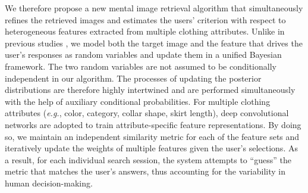 \documentclass[journal]{IEEEtran}
\begin{document}
We therefore propose a new mental image retrieval algorithm that simultaneously refines the retrieved images and estimates the users' criterion with respect to heterogeneous features extracted from multiple clothing attributes.
Unlike in previous studies \cite{fang2005experiments,ferecatu2007interactive,suditu2011heat,suditu2012iterative}, we model both the target image and the feature that drives the user's responses as random variables and update them in a unified Bayesian framework. The two random variables are not assumed to be conditionally independent in our algorithm. The processes of updating the posterior distributions are therefore highly intertwined and are performed simultaneously with the help of auxiliary conditional probabilities. For multiple clothing attributes (\textit{e.g.}, color, category, collar shape, skirt length), deep convolutional networks \cite{szegedy2015going} are adopted to train attribute-specific feature representations. By doing so, we maintain an independent similarity metric for each of the feature sets and iteratively update the weights of multiple features given the user's selections. As a result, for each individual search session, the system attempts to ``guess'' the metric that matches the user's answers, thus accounting for the variability in human decision-making.



\end{document}
